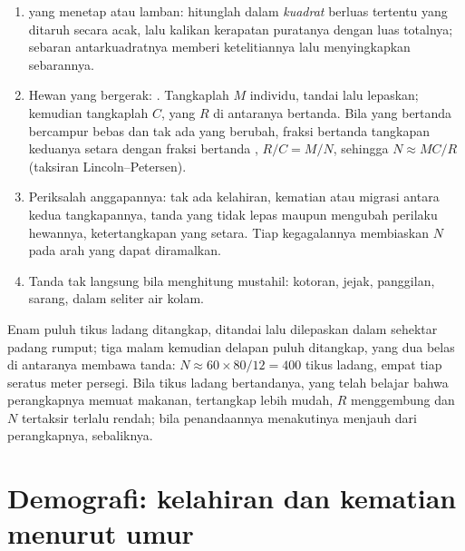 \begin{method}\label{met:b1:populations:counting}
\begin{enumerate}
  \item {} yang menetap atau lamban: hitunglah dalam
        \emph{kuadrat} berluas tertentu yang ditaruh secara acak, lalu
        kalikan kerapatan puratanya dengan luas totalnya; sebaran
        antarkuadratnya memberi ketelitiannya lalu menyingkapkan
        sebarannya.
  \item Hewan yang bergerak: \emph{}. Tangkaplah $M$
        individu, tandai lalu lepaskan; kemudian tangkaplah $C$, yang
        $R$ di antaranya bertanda. Bila yang bertanda bercampur bebas
        dan tak ada yang berubah, fraksi bertanda tangkapan keduanya
        setara dengan fraksi bertanda , $R/C = M/N$, sehingga
        $N \approx MC/R$ (taksiran Lincoln--Petersen).
  \item Periksalah anggapannya: tak ada kelahiran, kematian atau
        migrasi antara kedua tangkapannya, tanda yang tidak lepas
        maupun mengubah perilaku hewannya, ketertangkapan yang setara.
        Tiap kegagalannya membiaskan $N$ pada arah yang dapat
        diramalkan.
  \item Tanda tak langsung bila menghitung mustahil: kotoran, jejak,
        panggilan, sarang,  dalam seliter air kolam.
\end{enumerate}
\end{method}

\begin{example}\label{ex:b1:populations:voles}
Enam puluh tikus ladang ditangkap, ditandai lalu dilepaskan dalam
sehektar padang rumput; tiga malam kemudian delapan puluh ditangkap,
yang dua belas di antaranya membawa tanda:
$N \approx 60\times 80/12 = 400$ tikus ladang, empat tiap seratus meter
persegi. Bila tikus ladang bertandanya, yang telah belajar bahwa
perangkapnya memuat makanan, tertangkap lebih mudah, $R$ menggembung
dan $N$ tertaksir terlalu rendah; bila penandaannya menakutinya menjauh
dari perangkapnya, sebaliknya.
\end{example}

\section{Demografi: kelahiran dan kematian menurut umur}

